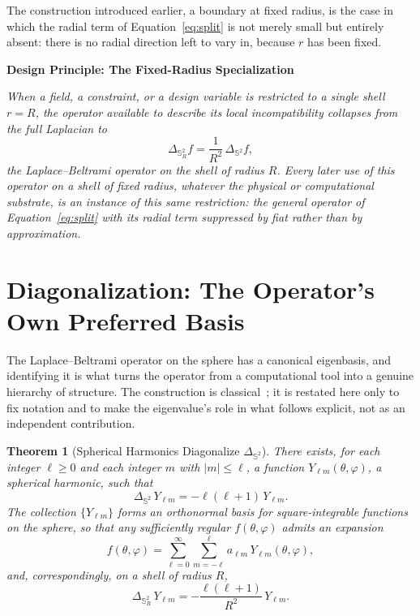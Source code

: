 \documentclass[11pt,fleqn]{book}
\numberwithin{equation}{chapter}
\newenvironment{principle}[1]
  {\begin{principleEnv}
   \noindent\textbf{Design Principle: #1}\par\smallskip\itshape}
  {\end{principleEnv}}
\theoremstyle{plain}
\newtheorem{theorem}{Theorem}[chapter]
\theoremstyle{definition}
\theoremstyle{remark}
\newcommand{\Sphere}{\mathbb{S}^{2}}
\begin{document}
The construction introduced earlier, a boundary at fixed radius, is the case in which the radial term of Equation~\eqref{eq:split} is not merely small but entirely absent: there is no radial direction left to vary in, because \(r\) has been fixed.

\begin{principle}{The Fixed-Radius Specialization}
When a field, a constraint, or a design variable is restricted to a single shell \(r=R\), the operator available to describe its local incompatibility collapses from the full Laplacian to
\[
\Delta_{\Sphere_R} f = \frac{1}{R^2}\,\Delta_{\Sphere} f,
\]
the Laplace--Beltrami operator on the shell of radius \(R\). Every later use of this operator on a shell of fixed radius, whatever the physical or computational substrate, is an instance of this same restriction: the general operator of Equation~\eqref{eq:split} with its radial term suppressed by fiat rather than by approximation.
\end{principle}

\section{Diagonalization: The Operator's Own Preferred Basis}

The Laplace--Beltrami operator on the sphere has a canonical eigenbasis, and identifying it is what turns the operator from a computational tool into a genuine hierarchy of structure. The construction is classical~\cite{muller1966}; it is restated here only to fix notation and to make the eigenvalue's role in what follows explicit, not as an independent contribution.

\begin{theorem}[Spherical Harmonics Diagonalize \texorpdfstring{\(\Delta_{\Sphere}\)}{the angular Laplacian}]
There exists, for each integer \(\ell\geq 0\) and each integer \(m\) with \(|m|\leq \ell\), a function \(Y_{\ell m}(\theta,\varphi)\), a spherical harmonic, such that
\[
\Delta_{\Sphere}\, Y_{\ell m} = -\ell(\ell+1)\, Y_{\ell m}.
\]
The collection \(\{Y_{\ell m}\}\) forms an orthonormal basis for square-integrable functions on the sphere, so that any sufficiently regular \(f(\theta,\varphi)\) admits an expansion
\[
f(\theta,\varphi) = \sum_{\ell=0}^{\infty}\sum_{m=-\ell}^{\ell} a_{\ell m}\, Y_{\ell m}(\theta,\varphi),
\]
and, correspondingly, on a shell of radius \(R\),
\[
\Delta_{\Sphere_R}\, Y_{\ell m} = -\frac{\ell(\ell+1)}{R^2}\, Y_{\ell m}.
\]
\end{theorem}
\end{document}
